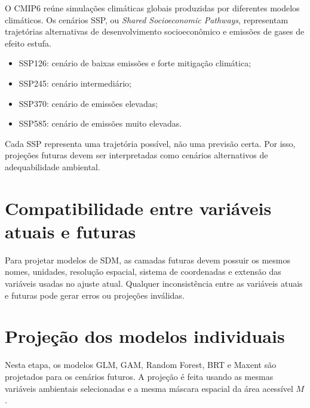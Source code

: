 O CMIP6 reúne simulações climáticas globais produzidas por diferentes modelos climáticos. Os cenários SSP, ou \textit{Shared Socioeconomic Pathways}, representam trajetórias alternativas de desenvolvimento socioeconômico e emissões de gases de efeito estufa.

\begin{itemize}
	\item SSP126: cenário de baixas emissões e forte mitigação climática;
	\item SSP245: cenário intermediário;
	\item SSP370: cenário de emissões elevadas;
	\item SSP585: cenário de emissões muito elevadas.
\end{itemize}

\begin{atencao}[title={\faExclamationTriangle\quad Cenário não é previsão única}]
	Cada SSP representa uma trajetória possível, não uma previsão certa. Por isso, projeções futuras devem ser interpretadas como cenários alternativos de adequabilidade ambiental.
\end{atencao}

\section{Compatibilidade entre variáveis atuais e futuras}

Para projetar modelos de SDM, as camadas futuras devem possuir os mesmos nomes, unidades, resolução espacial, sistema de coordenadas e extensão das variáveis usadas no ajuste atual. Qualquer inconsistência entre as variáveis atuais e futuras pode gerar erros ou projeções inválidas.



\section{Projeção dos modelos individuais}

Nesta etapa, os modelos GLM, GAM, Random Forest, BRT e Maxent são projetados para os cenários futuros. A projeção é feita usando as mesmas variáveis ambientais selecionadas e a mesma máscara espacial da área acessível \(M\).



